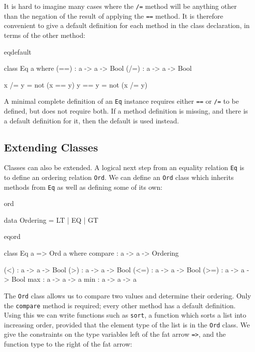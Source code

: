 \noindent
It is hard to imagine many cases where the \texttt{/=} method will be anything other
than the negation of the result of applying the \texttt{==} method. It is therefore
convenient to give a default definition for each method in the class
declaration, in terms of the other method:

\begin{SaveVerbatim}{eqdefault}

class Eq a where
    (==) : a -> a -> Bool
    (/=) : a -> a -> Bool

    x /= y = not (x == y)
    y == y = not (x /= y)

\end{SaveVerbatim}

\noindent
A minimal complete definition of an \texttt{Eq} instance requires either \texttt{==}
or \texttt{/=} to be defined, but does not require both. If a method definition is
missing, and there is a default definition for it, then the default is used instead.

\subsection{Extending Classes}

Classes can also be extended. A logical next step from an equality relation \texttt{Eq}
is to define an ordering relation \texttt{Ord}. We can define an \texttt{Ord} class
which inherits methods from \texttt{Eq} as well as defining some of its own:

\begin{SaveVerbatim}{ord}

data Ordering = LT | EQ | GT

\end{SaveVerbatim}

\begin{SaveVerbatim}{eqord}

class Eq a => Ord a where
    compare : a -> a -> Ordering

    (<) : a -> a -> Bool
    (>) : a -> a -> Bool
    (<=) : a -> a -> Bool
    (>=) : a -> a -> Bool
    max : a -> a -> a
    min : a -> a -> a

\end{SaveVerbatim}

\noindent
The \texttt{Ord} class allows us to compare two values and determine their ordering. 
Only the \texttt{compare} method is required; every other method has a default definition.
Using
this we can write functions such as \texttt{sort}, a function which sorts a list into
increasing order, provided that the element type of the list is in the \texttt{Ord} class.
We give the constraints on the type variables left of the fat arrow \texttt{=>}, and the
function type to the right of the fat arrow:


